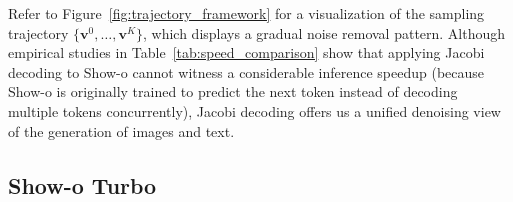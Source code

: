 Refer to Figure~\ref{fig:trajectory_framework} for a visualization of the sampling trajectory $\{ \mathbf{v}^{0}, \ldots, \mathbf{v}^{K}\}$, which displays a gradual noise removal pattern. 
Although empirical studies in Table~\ref{tab:speed_comparison} show that applying Jacobi decoding to Show-o cannot witness a considerable inference speedup (because Show-o is originally trained to predict the next token instead of decoding multiple tokens concurrently), Jacobi decoding offers us a unified denoising view of the generation of images and text. 

\subsection{Show-o Turbo}

